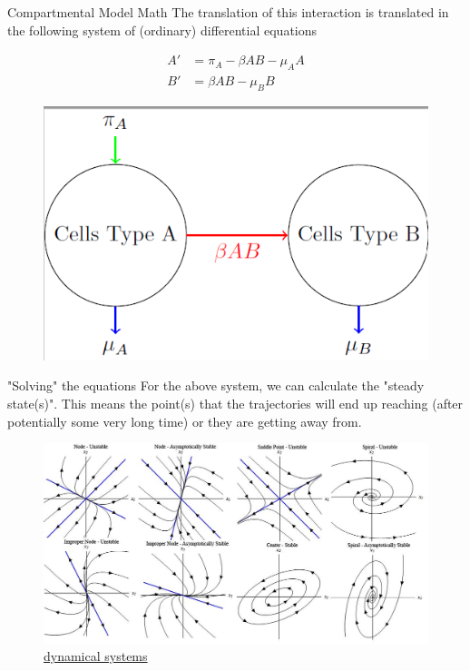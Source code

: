 \documentclass{beamer}
\begin{document}
\begin{frame}{Compartmental Model Math}
The translation of this interaction is translated in the following system of (ordinary) differential equations

\begin{equation}
	\begin{split}
		A'&= \pi_A - \beta A B - \mu_A A \\
		B'&= \beta A B - \mu_B B
	\end{split}
\end{equation}
	\begin{figure}[h]
	\centering
		\includegraphics[scale=0.4]{../Figures/fig_compartment.png}
\end{figure}

\end{frame}

\begin{frame}{"Solving" the equations}
	For the above system, we can calculate the "steady state(s)". This means the point(s) that the trajectories will end up reaching (after potentially some very long time) or they are getting away from.
\begin{figure}[h]
	\centering
		\includegraphics[scale=0.2]{../Figures/fig_dyn_sys.jpg}
		\caption{\href{https://discourse.julialang.org/t/plotting-dynamical-systems-trajectories/46166}{dynamical systems}}
\end{figure}	
	
\end{frame}
\end{document}
